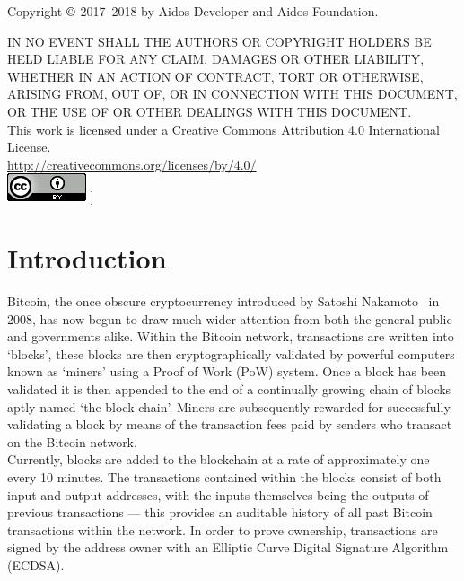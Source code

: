 \documentclass[a4paper,10pt,twocolumn]{article}
\begin{document}
			\vspace{1.5cm}
	
	\footnotesize
	Copyright \( \copyright \)  2017--2018 by Aidos Developer and Aidos Foundation.
	
	IN NO EVENT SHALL THE AUTHORS OR COPYRIGHT HOLDERS BE HELD LIABLE FOR ANY CLAIM, DAMAGES OR OTHER
	LIABILITY, WHETHER IN AN ACTION OF CONTRACT, TORT OR OTHERWISE, ARISING FROM,
	OUT OF, OR IN CONNECTION WITH THIS DOCUMENT, OR THE USE OF OR OTHER DEALINGS WITH
	THIS DOCUMENT\@.\\
	
	This work is licensed under a Creative Commons Attribution 4.0 International License. \\
	\url{http://creativecommons.org/licenses/by/4.0/} \\
	\includegraphics{cc}
	]
	
	\normalsize
	\twocolumn[
	\tableofcontents
	\listoffigures
	]
	
	\clearpage
	
	\section{Introduction}
	Bitcoin, the once obscure cryptocurrency introduced by Satoshi Nakamoto~\cite{btc} in 2008, has now begun to draw much wider attention 
	from both the general public and governments alike. Within the Bitcoin network, transactions are written into `blocks', these blocks 
	are then cryptographically validated by powerful computers known as `miners' using a Proof of Work (PoW) system. Once a block has been 
	validated it is then appended to the end of a continually growing chain of blocks aptly named `the block-chain'. Miners are 
	subsequently rewarded for successfully validating a block by means of the transaction fees paid by senders who transact on the Bitcoin 
	network.\\
	
	Currently, blocks are added to the blockchain at a rate of approximately one every 10 minutes. The transactions contained within the
	blocks consist of both input and output addresses, with the inputs themselves being the outputs of previous transactions --- this 
	provides an auditable history of all past Bitcoin transactions within the network. In order to prove ownership, transactions are signed 
	by the address owner with an Elliptic Curve Digital Signature Algorithm (ECDSA).\\
	
\end{document}
